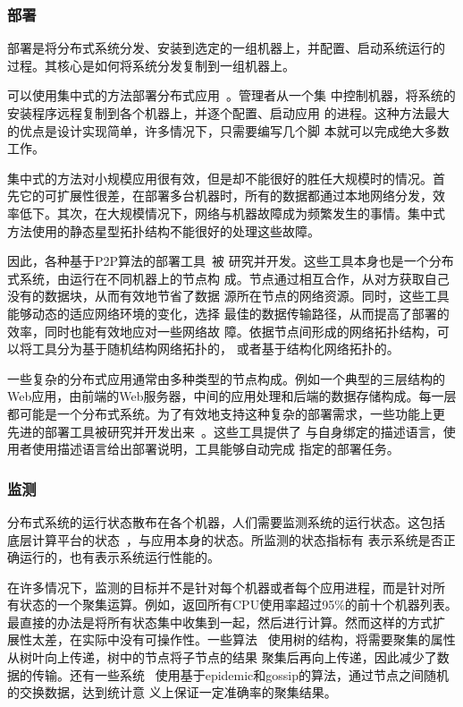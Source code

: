 \subsubsection*{部署}

部署是将分布式系统分发、安装到选定的一组机器上，并配置、启动系统运行的
过程。其核心是如何将系统分发复制到一组机器上。

可以使用集中式的方法部署分布式应用~\cite{vxargs, pssh}。管理者从一个集
中控制机器，将系统的安装程序远程复制到各个机器上，并逐个配置、启动应用
的进程。这种方法最大的优点是设计实现简单，许多情况下，只需要编写几个脚
本就可以完成绝大多数工作。

集中式的方法对小规模应用很有效，但是却不能很好的胜任大规模时的情况。首
先它的可扩展性很差，在部署多台机器时，所有的数据都通过本地网络分发，效
率低下。其次，在大规模情况下，网络与机器故障成为频繁发生的事情。集中式
方法使用的静态星型拓扑结构不能很好的处理这些故障。

因此，各种基于P2P算法的部署工具~\cite{bittorrent, codeploy, sharkfs}被
研究并开发。这些工具本身也是一个分布式系统，由运行在不同机器上的节点构
成。节点通过相互合作，从对方获取自己没有的数据块，从而有效地节省了数据
源所在节点的网络资源。同时，这些工具能够动态的适应网络环境的变化，选择
最佳的数据传输路径，从而提高了部署的效率，同时也能有效地应对一些网络故
障。依据节点间形成的网络拓扑结构，可以将工具分为基于随机结构网络拓扑的，
或者基于结构化网络拓扑的。

一些复杂的分布式应用通常由多种类型的节点构成。例如一个典型的三层结构的
Web应用，由前端的Web服务器，中间的应用处理和后端的数据存储构成。每一层
都可能是一个分布式系统。为了有效地支持这种复杂的部署需求，一些功能上更
先进的部署工具被研究并开发出来~\cite{plush, smartfrog}。这些工具提供了
与自身绑定的描述语言，使用者使用描述语言给出部署说明，工具能够自动完成
指定的部署任务。

\subsubsection*{监测}

分布式系统的运行状态散布在各个机器，人们需要监测系统的运行状态。这包括
底层计算平台的状态~\cite{comon}，与应用本身的状态。所监测的状态指标有
表示系统是否正确运行的，也有表示系统运行性能的。

在许多情况下，监测的目标并不是针对每个机器或者每个应用进程，而是针对所
有状态的一个聚集运算。例如，返回所有CPU使用率超过95\%的前十个机器列表。
最直接的办法是将所有状态集中收集到一起，然后进行计算。然而这样的方式扩
展性太差，在实际中没有可操作性。一些算法~\cite{sdims, somo, sanfermin}
使用树的结构，将需要聚集的属性从树叶向上传递，树中的节点将子节点的结果
聚集后再向上传递，因此减少了数据的传输。还有一些系统~\cite{astrolabe}
使用基于epidemic和gossip的算法，通过节点之间随机的交换数据，达到统计意
义上保证一定准确率的聚集结果。

